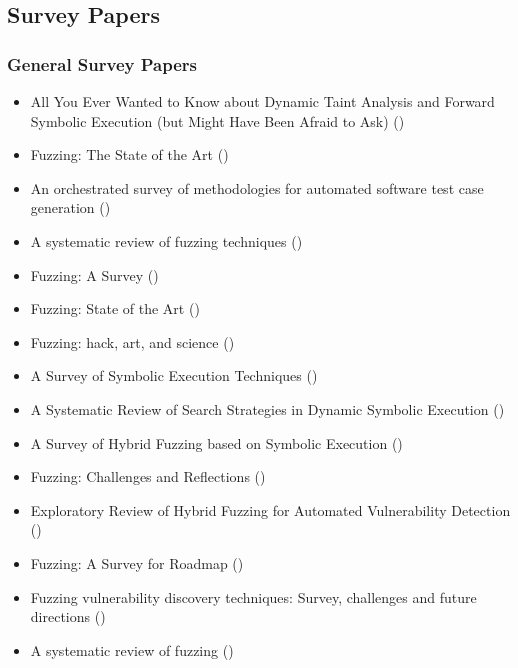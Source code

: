 \documentclass{article}
\begin{document}
\begin{multicols}{2}
    \subsection{Survey Papers}
    \subsubsection{General Survey Papers}
    \begin{itemize}
        \item    All You Ever Wanted to Know about Dynamic Taint Analysis and Forward Symbolic Execution (but Might Have Been Afraid to Ask) (\citeyear{AllYouEverWanted})\cite{AllYouEverWanted}
        \item    Fuzzing: The State of the Art (\citeyear{FuzzingTheStateOfTheArt})\cite{FuzzingTheStateOfTheArt}
        \item    An orchestrated survey of methodologies for automated software test case generation (\citeyear{Orchestrated})\cite{Orchestrated}
        \item    A systematic review of fuzzing techniques (\citeyear{Science})\cite{Science}
        \item    Fuzzing: A Survey (\citeyear{FuzzingASurvey})\cite{FuzzingASurvey}
        \item    Fuzzing: State of the Art (\citeyear{FuzzingStateOfTheArt2018})\cite{FuzzingStateOfTheArt2018}
        \item    Fuzzing: hack, art, and science (\citeyear{HackArtScience})\cite{HackArtScience}
        \item    A Survey of Symbolic Execution Techniques (\citeyear{SurveySymbex})\cite{SurveySymbex}
        \item    A Systematic Review of Search Strategies in Dynamic Symbolic Execution (\citeyear{SearchStrategies})\cite{SearchStrategies}
        \item    A Survey of Hybrid Fuzzing based on Symbolic Execution (\citeyear{SurveyHybrid})\cite{SurveyHybrid}
        \item    Fuzzing: Challenges and Reflections (\citeyear{ChallengesAndReflections})\cite{ChallengesAndReflections}
        \item    Exploratory Review of Hybrid Fuzzing for Automated Vulnerability Detection (\citeyear{Hybrid})\cite{Hybrid}
        \item    Fuzzing: A Survey for Roadmap (\citeyear{FuzzingASurveyforRoadmap})\cite{FuzzingASurveyforRoadmap}
        \item    Fuzzing vulnerability discovery techniques: Survey, challenges and future directions (\citeyear{FuzzingVulnerabilityDiscoveryTechniques})\cite{FuzzingVulnerabilityDiscoveryTechniques}
        \item    A systematic review of fuzzing (\citeyear{SystematicReview2023})\cite{SystematicReview2023}
    \end{itemize}


\end{multicols}
\end{document}
